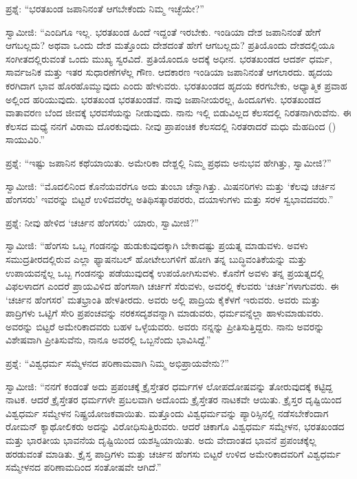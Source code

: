  ಪ್ರಶ್ನೆ: “ಭರತಖಂಡ ಜಪಾನಿನಂತೆ ಆಗಬೇಕೆಂದು ನಿಮ್ಮ ಇಚ್ಛೆಯೇ?” 

 ಸ್ವಾಮೀಜಿ: “ಎಂದಿಗೂ ಇಲ್ಲ. ಭರತಖಂಡ ಹಿಂದೆ ಇದ್ದಂತೆ ಇರಬೇಕು. ಇಂಡಿಯಾ ದೇಶ ಜಪಾನಿನಂತೆ ಹೇಗೆ ಆಗಬಲ್ಲದು? ಅಥವಾ ಒಂದು ದೇಶ ಮತ್ತೊಂದು ದೇಶದಂತೆ ಹೇಗೆ ಆಗಬಲ್ಲದು? ಪ್ರತಿಯೊಂದು ದೇಶದಲ್ಲಿಯೂ ಸಂಗೀತದಲ್ಲಿರುವಂತೆ ಒಂದು ಮುಖ್ಯ ಸ್ವರವಿದೆ. ಪ್ರತಿಯೊಂದೂ ಅದಕ್ಕೆ ಅಧೀನ. ಭರತಖಂಡದ ಆದರ್ಶ ಧರ್ಮ, ಸಾರ್ವಜನಿಕ ಮತ್ತು ಇತರ ಸುಧಾರಣೆಗಳೆಲ್ಲ ಗೌಣ. ಆದಕಾರಣ ಇಂಡಿಯಾ ಜಪಾನಿನಂತೆ ಆಗಲಾರದು. ಹೃದಯ ಕರಗಿದಾಗ ಭಾವ ಹೊರಹೊಮ್ಮುವುದು ಎಂದು ಹೇಳುವರು. ಭರತಖಂಡದ ಹೃದಯ ಕರಗಬೇಕು, ಅಧ್ಯಾತ್ಮಿಕ ಪ್ರವಾಹ ಅಲ್ಲಿಂದ ಹರಿಯುವುದು. ಭರತಖಂಡ ಭರತಖಂಡವೆ. ನಾವು ಜಪಾನೀಯರಲ್ಲ, ಹಿಂದೂಗಳು. ಭರತಖಂಡದ ವಾತಾವರಣ ಬೆಂದ ಜೀವಕ್ಕೆ ಭರವಸೆಯನ್ನು ನೀಡುವುದು. ನಾನು ಇಲ್ಲಿ ಬಿಡುವಿಲ್ಲದ ಕೆಲಸದಲ್ಲಿ ನಿರತನಾಗಿರುವೆನು. ಈ ಕೆಲಸದ ಮಧ್ಯೆ ನನಗೆ ವಿರಾಮ ದೊರಕುವುದು. ನೀವು ಪ್ರಾಪಂಚಿಕ ಕೆಲಸದಲ್ಲಿ ನಿರತರಾದರೆ ಮಧು ಮೆಹದಿಂದ () ಸಾಯುವಿರಿ.” 

 ಪ್ರಶ್ನೆ: “ಇಷ್ಟು ಜಪಾನಿನ ಕಥೆಯಾಯಿತು. ಅಮೇರಿಕಾ ದೇಶ್ದಲ್ಲಿ ನಿಮ್ಮ ಪ್ರಥಮ ಅನುಭವ ಹೇಗಿತ್ತು, ಸ್ವಾಮೀಜಿ?” 

 ಸ್ವಾಮೀಜಿ: “ಮೊದಲಿನಿಂದ ಕೊನೆಯವರೆಗೂ ಅದು ತುಂಬಾ ಚೆನ್ನಾಗಿತ್ತು. ಮಿಷನರಿಗಳು ಮತ್ತು ‘ಕೆಲವು ಚರ್ಚಿನ ಹೆಂಗಸರು’ ಇವರನ್ನು ಬಿಟ್ಟರೆ ಉಳಿದವರೆಲ್ಲ ಅತಿಥಿಸತ್ಕಾರಪರರು, ದಯಾಳುಗಳು ಮತ್ತು ಸರಳ ಸ್ವಭಾವದವರು.” 

 ಪ್ರಶ್ನೆ: ನೀವು ಹೇಳಿದ ‘ಚರ್ಚಿನ ಹೆಂಗಸರು’ ಯಾರು, ಸ್ವಾಮೀಜಿ?” 

 ಸ್ವಾಮೀಜಿ: “ಹೆಂಗಸು ಒಬ್ಬ ಗಂಡನನ್ನು ಹುಡುಕುವುದಕ್ಕಾಗಿ ಬೇಕಾದಷ್ಟು ಪ್ರಯತ್ನ ಮಾಡುವಳು. ಅವಳು ಸಮುದ್ರತೀರದಲ್ಲಿರುವ ಎಲ್ಲಾ ಫ್ಯಾಷನಬಲ್ ಹೋಟೇಲುಗಳಿಗೆ ಹೋಗಿ ತನ್ನ ಬುದ್ಧಿವಂತಿಕೆಯನ್ನು ಮತ್ತು ಉಪಾಯವನ್ನೆಲ್ಲ ಒಬ್ಬ ಗಂಡನನ್ನು ಪಡೆಯುವುದಕ್ಕೆ ಉಪಯೋಗಿಸುವಳು. ಕೊನೆಗೆ ಅವಳು ತನ್ನ ಪ್ರಯತ್ನದಲ್ಲಿ ವಿಫಲಳಾದಗ  ಎಂದರೆ ಪ್ರಾಯವಿಳಿದ ಹೆಂಗಸಾಗಿ ಚರ್ಚಿಗೆ ಸೆರುವಳು, ಅವರಲ್ಲಿ ಕೆಲವರು ‘ಚರ್ಚಿ’ಗಳಾಗುವರು. ಈ ‘ಚರ್ಚಿನ ಹೆಂಗಸರ’ ಮತಭ್ರಾಂತಿ ಹೇಳತೀರದು. ಅವರು ಅಲ್ಲಿ ಪಾದ್ರಿಯ ಕೈಕೆಳಗೆ ಇರುವರು. ಅವರು ಮತ್ತು ಪಾದ್ರಿಗಳು ಒಟ್ಟಿಗೆ ಸೇರಿ ಪ್ರಪಂಚವನ್ನು ನರಕಸದೃಶವನ್ನಾಗಿ ಮಾಡುವರು, ಧರ್ಮವನ್ನೆಲ್ಲಾ ಹಾಳುಮಾಡುವರು. ಅವರನ್ನು ಬಿಟ್ಟರೆ ಅಮೇರಿಕಾದವರು ಬಹಳ ಒಳ್ಳೆಯವರು. ಅವರು ನನ್ನನ್ನು ಪ್ರೀತಿಸುತ್ತಿದ್ದರು. ನಾನು ಅವರನ್ನು ವಿಶೇಷವಾಗಿ ಪ್ರೀತಿಸುವೆನು, ನಾನೂ ಅವರಲ್ಲಿ ಒಬ್ಬನೆಂದು ಭಾವಿಸಿದ್ದೆ.” 

 ಪ್ರಶ್ನೆ: “ವಿಶ್ವಧರ್ಮ ಸಮ್ಮೆಳನದ ಪರಿಣಾಮವಾಗಿ ನಿಮ್ಮ ಅಭಿಪ್ರಾಯವೇನು?” 

 ಸ್ವಾಮೀಜಿ: “ನನಗೆ ಕಂಡಂತೆ ಅದು ಪ್ರಪಂಚಕ್ಕೆ ಕ್ರೈಸ್ತೇತರ ಧರ್ಮಗಳ ಲೋಪದೋಷವನ್ನು ತೋರುವುದಕ್ಕೆ ಕಟ್ಟಿದ್ದ ನಾಟಕ. ಆದರೆ ಕ್ರೈಸ್ತೇತರ ಧರ್ಮಗಳೇ ಪ್ರಬಲವಾಗಿ ಅದೊಂದು ಕ್ರೈಸ್ತೇತರ ನಾಟಕವೇ ಆಯಿತು. ಕ್ರೈಸ್ತರ ದೃಷ್ಟಿಯಿಂದ ವಿಶ್ವಧರ್ಮ ಸಮ್ಮೇಳನ ನಿಷ್ಪ್ರಯೋಜಕವಾಯಿತು. ಮತ್ತೊಂದು ವಿಶ್ವಧರ್ಮವನ್ನು ಪ್ಯಾರಿಸ್ಸಿನಲ್ಲಿ ನಡೆಸಬೇಕೆಂದಾಗ ರೋಮನ್ ಕ್ಯಾಥೋಲಿಕರು ಅದನ್ನು ವಿರೋಧಿಸುತ್ತಿರುವರು. ಆದರೆ ಚಿಕಾಗೊ ವಿಶ್ವಧರ್ಮ ಸಮ್ಮೇಳನ, ಭರತಖಂಡದ ಮತ್ತು ಭಾರತೀಯ ಭಾವನೆಯ ದೃಷ್ಟಿಯಿಂದ ಯಶಸ್ವಿಯಾಯಿತು. ಅದು ವೇದಾಂತದ ಭಾವನೆ ಪ್ರಪಂಚಕ್ಕೆಲ್ಲ ಹರಡುವಂತೆ ಮಾಡಿತು. ಕ್ರೈಸ್ತ ಪಾದ್ರಿಗಳು ಮತ್ತು ಚರ್ಚಿನ ಹೆಂಗಸು ಬಿಟ್ಟರೆ ಉಳಿದ ಅಮೇರಿಕಾದವರಿಗೆ ವಿಶ್ವಧರ್ಮ ಸಮ್ಮೇಳನದ ಪರಿಣಾಮದಿಂದ ಸಂತೋಷವೇ ಆಗಿದೆ.” 

